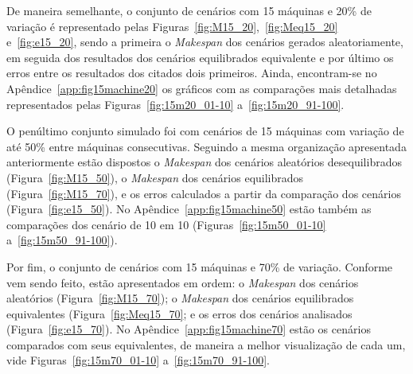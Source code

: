    
    
    De maneira semelhante, o conjunto de cenários com 15 máquinas e 20\% de variação é representado pelas Figuras~\ref{fig:M15_20},~\ref{fig:Meq15_20} e~\ref{fig:e15_20}, sendo a primeira o \textit{Makespan} dos cenários gerados aleatoriamente, em seguida dos resultados dos cenários equilibrados equivalente e por último os erros entre os resultados dos citados dois primeiros. Ainda, encontram-se no Apêndice~\ref{app:fig15machine20} os gráficos com as comparações mais detalhadas representados pelas Figuras~\ref{fig:15m20_01-10} a~\ref{fig:15m20_91-100}.
    
    
    
    
    
    
    
    O penúltimo conjunto simulado foi com cenários de 15 máquinas com variação de até 50\% entre máquinas consecutivas. Seguindo a mesma organização apresentada anteriormente estão dispostos o \textit{Makespan} dos cenários aleatórios desequilibrados (Figura~\ref{fig:M15_50}), o \textit{Makespan} dos cenários equilibrados (Figura~\ref{fig:M15_70}), e os erros calculados a partir da comparação dos cenários (Figura~\ref{fig:e15_50}). No Apêndice~\ref{app:fig15machine50} estão também as comparações dos cenário de 10 em 10 (Figuras~\ref{fig:15m50_01-10} a~\ref{fig:15m50_91-100}).
    
    
    
    
    
    
    
    Por fim, o conjunto de cenários com 15 máquinas e 70\% de variação. Conforme vem sendo feito, estão apresentados em ordem: o \textit{Makespan} dos cenários aleatórios (Figura~\ref{fig:M15_70}); o \textit{Makespan} dos cenários equilibrados equivalentes (Figura~\ref{fig:Meq15_70}; e os erros dos cenários analisados (Figura~\ref{fig:e15_70}). No Apêndice~\ref{app:fig15machine70} estão os cenários comparados com seus equivalentes, de maneira a melhor visualização de cada um, vide Figuras~\ref{fig:15m70_01-10} a~\ref{fig:15m70_91-100}.
    
    
    
    
    
